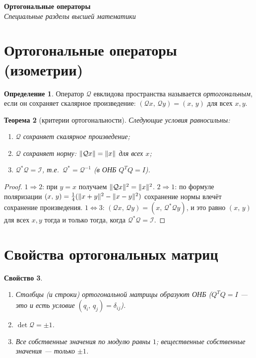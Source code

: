 \documentclass[11pt,a4paper]{article}
\newcommand{\coursename}{Специальные разделы высшей математики}
\newcommand{\doctitle}{Ортогональные операторы}
\theoremstyle{definition}
\newtheorem{definition}{Определение}[section]
\theoremstyle{plain}
\newtheorem{theorem}[definition]{Теорема}
\newtheorem{property}[definition]{Свойство}
\newcommand{\scal}[2]{\left( #1,\,#2\right)}
\DeclarePairedDelimiter{\norm}{\lVert}{\rVert}
\begin{document}
\begin{center}
  {\LARGE\bfseries \doctitle}\\[4pt]
  {\large\itshape \coursename}
\end{center}
\vspace{6pt}

\section{Ортогональные операторы (изометрии)}

\begin{definition}
Оператор $\mathcal Q$ евклидова пространства называется \emph{ортогональным}, если он сохраняет
скалярное произведение: $\scal{\mathcal Qx}{\mathcal Qy}=\scal xy$ для всех $x,y$.
\end{definition}

\begin{theorem}[критерии ортогональности]
Следующие условия равносильны:
\begin{enumerate}[label=\arabic*),leftmargin=*,nosep]
  \item $\mathcal Q$ сохраняет скалярное произведение;
  \item $\mathcal Q$ сохраняет норму: $\norm{\mathcal Qx}=\norm x$ для всех $x$;
  \item $\mathcal Q^*\mathcal Q=\mathcal I$, т.е.\ $\mathcal Q^*=\mathcal Q^{-1}$ (в ОНБ
        $Q^{T}Q=I$).
\end{enumerate}
\end{theorem}

\begin{proof}
$1\Rightarrow2$: при $y=x$ получаем $\norm{\mathcal Qx}^2=\norm x^2$. $2\Rightarrow1$: по формуле
поляризации $\scal xy=\tfrac14(\norm{x+y}^2-\norm{x-y}^2)$ сохранение нормы влечёт сохранение
произведения. $1\Leftrightarrow3$: $\scal{\mathcal Qx}{\mathcal Qy}=\scal{x}{\mathcal Q^*\mathcal Qy}$,
и это равно $\scal xy$ для всех $x,y$ тогда и только тогда, когда $\mathcal Q^*\mathcal Q=\mathcal I$.
\end{proof}

\section{Свойства ортогональных матриц}

\begin{property}\leavevmode
\begin{enumerate}[label=\arabic*),leftmargin=*,nosep]
  \item Столбцы (и строки) ортогональной матрицы образуют ОНБ ($Q^{T}Q=I$ — это и есть условие
        $\scal{q_i}{q_j}=\delta_{ij}$).
  \item $\det\mathcal Q=\pm1$.
  \item Все собственные значения по модулю равны $1$; вещественные собственные значения — только
        $\pm1$.
\end{enumerate}
\end{property}
\end{document}
